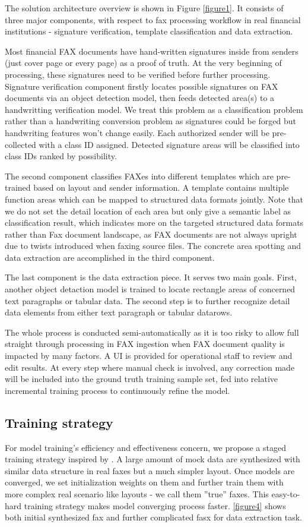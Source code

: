 \documentclass[sigconf]{acmart}
\begin{document}
The solution architecture overview is shown in Figure \ref{figure1}. It consists of three major components, with respect to fax processing workflow in real financial institutions - signature verification, template classification and data extraction.

Most financial FAX documents have hand-written signatures inside from senders (just cover page or every page) as a proof of truth. At the very beginning of processing, these signatures need to be verified before further processing. Signature verification component firstly locates possible signatures on FAX documents via an object detection model, then feeds detected area(s) to a handwritting verification model. We treat this problem as a classification problem rather than a handwriting conversion problem as signatures could be forged but handwriting features won't change easily. Each authorized sender will be pre-collected with a class ID assigned. Detected signature areas will be classified into class IDs ranked by possibility. 

The second component classifies FAXes into different templates which are pre-trained based on layout and sender information. A template contains multiple function areas which can be mapped to structured data formats jointly. Note that we do not set the detail location of each area but only give a semantic label as classification result, which indicates more on the targeted structured data formats rather than Fax document landscape, as FAX documents are not always upright due to twists introduced when faxing source files. The concrete area spotting and data extraction are accomplished in the third component.

The last component is the data extraction piece. It serves two main goals. First, another object detaction model is trained to locate rectangle areas of concerned text paragraphs or tabular data. The second step is to further recognize detail data elements from either text paragraph or tabular datarows. 

The whole process is conducted semi-automatically as it is too risky to allow full straight through processing in FAX ingestion when FAX document quality is impacted by many factors. A UI is provided for operational staff to review and edit results. At every step where manual check is involved, any correction made will be included into the ground truth training sample set, fed into relative incremental training process to continuously refine the model.

\subsection{Training strategy}
For model training's efficiency and effectiveness concern, we propose a staged training strategy inspired by \cite{bengio2009curriculum}. A large amount of mock data are synthesized with similar data structure in real faxes but a much simpler layout. Once models are converged, we set initialization weights on them and further train them with more complex real scenario like layouts - we call them ''true'' faxes. This easy-to-hard training strategy makes model converging process faster. \ref{figure4} shows both initial synthesized fax and further complicated fasx for data extraction task.
\end{document}
